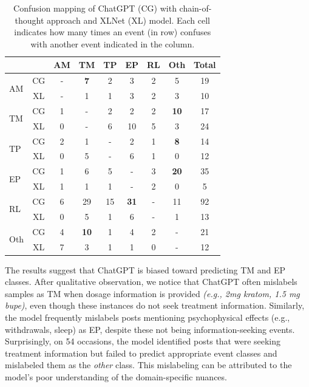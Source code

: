 \documentclass[letterpaper]{article}
\begin{document}
\begin{itemize}
\begin{table}[h!]
\renewcommand*{\arraystretch}{0.91}
\centering
\footnotesize
\begin{tabular}
{lc|cccccc|c}
& &{\textbf{AM}}& {\textbf{TM}}& {\textbf{TP}} & {\textbf{EP}} & {\textbf{RL}} & \textbf{Oth} & Total\\
\midrule
 \multirow{2}{*}{AM} & CG &-  & \textbf{7} & 2 & 3 & 2 & 5 & 19\\
 & XL & - & 1 & 1 & 3 & 2 & 3 & 10 \\
\midrule

 \multirow{2}{*}{TM} &CG & 1 & - & 2 & 2 & 2 & \textbf{10} & 17\\
 & XL& 0 & - & 6 & {10} & 5 & 3 & {24} \\

\midrule
 \multirow{2}{*}{TP} &CG & 2 & 1 & - & 2 & 1 & \textbf{8}  & 14\\
&XL & 0 & 5 & - & 6 & 1 & 0 & 12 \\
\midrule
 \multirow{2}{*}{EP} &CG & 1 & 6 & 5 & - & 3 & \textbf{20} & 35\\
& XL & 1 & 1 & 1 & - & 2 & 0 & 5 \\
\midrule
 \multirow{2}{*}{RL} &CG & 6 & 29 & 15 & \textbf{31} & - & 11 & 92\\
&XL & 0 & 5 & 1 & 6 & - & 1 & 13 \\

\midrule
\multirow{2}{*}{Oth} &CG & 4 & \textbf{10} & 1 & 4 & 2 & - & 21\\
&XL & 7 & 3 & 1 & 1 & 0 & - & 12 \\
\hline

\end{tabular}
\caption{Confusion mapping of ChatGPT (CG) with chain-of-thought approach and XLNet (XL) model. Each cell indicates how many times an event (in row) confuses with another event indicated in the column.
}
\label{confusion-table}
\end{table}



The results suggest that ChatGPT is biased toward predicting TM and EP classes. After qualitative observation, we notice that ChatGPT often mislabels samples as TM when dosage information is provided \textit{(e.g., 2mg kratom, 1.5 mg bupe)}, even though these instances do not seek treatment information. Similarly, the model frequently mislabels posts mentioning psychophysical effects (e.g., withdrawals, sleep) as EP, despite these not being information-seeking events. Surprisingly, on 54 occasions, the model identified posts that were seeking treatment information but failed to predict appropriate event classes and mislabeled them as the \textit{other} class. This mislabeling can be attributed to the model's poor understanding of the domain-specific nuances.
\end{itemize}
\end{document}
